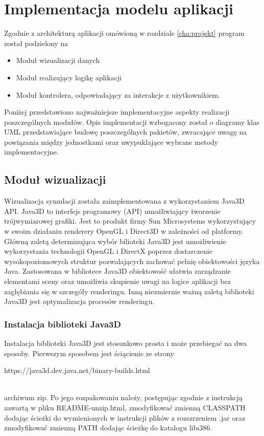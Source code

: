 \section {Implementacja modelu aplikacji}
Zgodnie z architekturą aplikacji omówioną w rozdziale \ref{cha:projekt} program został podzielony na 
\begin{itemize}
\item Moduł wizualizacji danych
\item Moduł realizujący logikę aplikacji
\item Moduł kontrolera, odpowiadający za interakcje z użytkownikiem.
\end{itemize}
Poniżej przedstawiono najważniejsze implementacyjne aspekty realizacji poszczególnych modułów.
Opis implementacji wzbogacony został o diagramy klas UML przedstawiające budowę poszczególnych pakietów, zwracające uwagę na powiązania między jednostkami oraz uwypuklające wybrane metody implementacyjne.
\subsection {Moduł wizualizacji}
Wizualizacja symulacji została zaimplementowana z wykorzystaniem Java3D API.
Java3D to interfejs programowy (API) umożliwiający tworzenie trójwymiarowej grafiki. Jest to produkt firmy Sun Microsystems wykorzystujący w swoim działaniu renderery OpenGL i Direct3D w zależności od platformy.
Główną zaletą determinująca wybór bilioteki Java3D jest umożliwienie wykorzystania technologii OpenGL i DirectX poprzez dostarczenie wysokopoziomowych struktur pozwalających zachować pełnię obiektowości języka Java. 
Zastosowana w bibliotece Java3D obiektowość ułatwia zarządzanie elementami sceny oraz umożliwia skupienie uwagi na logice aplikacji bez zagłębiania się w szczegóły renderingu. Inną niezmiernie ważną zaletą biblioteki Java3D jest optymalizacja procesów renderingu.
\subsubsection{Instalacja biblioteki Java3D}
Instalacja biblioteki Java3D jest stosunkowo prosta i może przebiegać na dwa sposoby.
Pierwszym sposobem jest ściącienie ze strony 
\begin{center}
https://java3d.dev.java.net/binary-builds.html
\end{center} \\
 archiwum zip. Po jego rozpakowaniu należy, postępując zgodnie z instrukcją zawartą w pliku README-unzip.html, zmodyfikować zmienną CLASSPATH dodając ścieżki do wymienionych w instrukcji plików z rozszrzeniem .jar oraz zmodyfikować zmienną PATH dodając ścieżkę do katalogu lib\i386.


